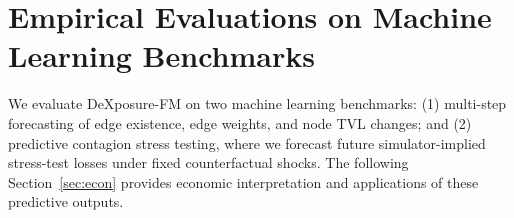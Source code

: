 \section{Empirical Evaluations on Machine Learning Benchmarks}
\label{sec:evaluation}

We evaluate DeXposure-FM on two machine learning benchmarks: (1) {multi-step forecasting} of edge existence, edge weights, and node TVL changes; and (2) {predictive contagion stress testing}, where we forecast future simulator-implied stress-test losses under fixed counterfactual shocks. The following Section~\ref{sec:econ} provides economic interpretation and applications of these predictive outputs.



